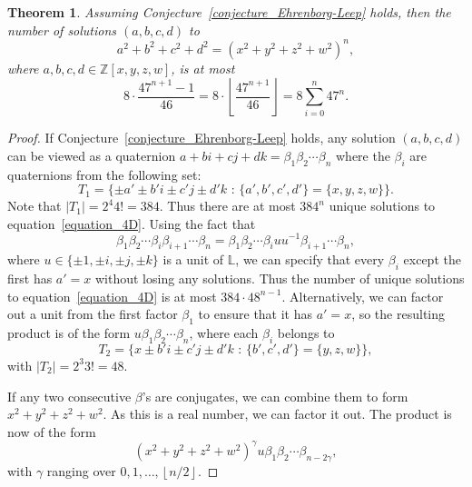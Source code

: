 \documentclass[12pt,table]{article}
\newtheorem{theorem}{Theorem}[section]
\theoremstyle{definition}
\theoremstyle{remark}
\newcommand{\Zzz}{\mathbb Z}
\newcommand{\Lll}{\mathbb L}
\newcommand{\myfrac}[2]{#1 / #2}
\numberwithin{equation}{section}
\begin{document}
\begin{theorem}
\label{theorem_counting_4D}
Assuming Conjecture~\ref{conjecture_Ehrenborg-Leep} holds,
then the number of solutions $ (a, b, c, d) $ to
\begin{equation}
\label{equation_4D}
a^2 + b^2 + c^2 + d^2 = (x^2 + y^2 + z^2 + w^2)^n,
\end{equation}
where $ a, b, c, d \in \Zzz[x,y,z,w]$,
is at most
\[
8 \cdot \frac{47^{n+1} - 1}{46}
=  8 \cdot \left\lfloor \frac{ 47^{n+1} }{46} \right\rfloor
=  8 \sum_{i = 0}^n{47^n}.
\]
\end{theorem}
\begin{proof}
If Conjecture~\ref{conjecture_Ehrenborg-Leep} holds, any
solution
$ (a, b, c, d) $ can be viewed as a quaternion
$ a + bi + cj + dk = \beta_1 \beta_2 \dotsm \beta_n $
where the $\beta_i$ are quaternions from the following set:
\[
T_1 = \{ \pm a' \pm b'i \pm c'j \pm d'k
\text{ : } \{ a', b', c', d' \} = \{ x, y, z, w \} \}. 
\]
Note that $ | T_1 | = 2^4 4! = 384 $.
Thus there are at most $ 384^n $ unique solutions to equation~\eqref{equation_4D}.
Using the fact that
\[
\beta_1 \beta_2 \dotsm \beta_i \beta_{i+1} \dotsm \beta_n
=
\beta_1 \beta_2 \dotsm \beta_i u u^{-1} \beta_{i+1} \dotsm \beta_n,
\]
where $ u \in \{ \pm 1 , \pm i, \pm j, \pm k \} $ is a unit of $\Lll$,
we can specify
that every $\beta_i$ except the first has $ a' = x $ without
losing any solutions. Thus the number of unique solutions
to equation~\eqref{equation_4D} is at most
$ 384 \cdot 48^{n-1} $. Alternatively, we can factor out a unit
from the first factor $\beta_1$ to ensure that it has $ a' = x $, so the
resulting product is of the form $ u \beta_1 \beta_2 \dotsm \beta_n $,
where each $ \beta_i $ belongs to
\[
T_2 = \{ x \pm b'i \pm c'j \pm d'k
\text{ : } \{ b', c', d' \} = \{ y, z, w \} \},
\]
with $ | T_2 | = 2^3 3! = 48 $.

If any two consecutive $ \beta $'s are conjugates, we can combine them
to form $ x^2 + y^2 + z^2 + w^2 $. As this is a real number, we can
factor it out. The product is now of the form
\[
(x^2 + y^2 + z^2 + w^2)^\gamma u \beta_1 \beta_2 \dotsm \beta_{n-2\gamma},
\]
with $ \gamma $ ranging over $ 0, 1, \dotsc, \left\lfloor \myfrac{n}{2} \right\rfloor $.


\end{proof}
\end{document}

